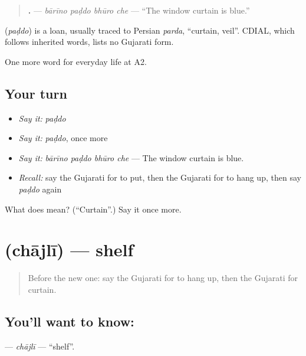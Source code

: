 \begin{quote}
\textbf{   .} — \emph{bārīno paḍdo bhūro che} — \textquotedblleft{}The window curtain is blue.\textquotedblright{}
\end{quote}

\begin{cousinweb}
\textbf{} (\emph{paḍdo}) is a loan, usually traced to Persian \emph{parda}, \textquotedblleft{}curtain, veil\textquotedblright{}. CDIAL, which follows inherited words, lists no Gujarati form.
\end{cousinweb}

\begin{grammarlens}[title={What you've built}]
One more word for everyday life at A2.
\end{grammarlens}

\subsection*{Your turn}
\begin{itemize}
\raggedright
  \item \emph{Say it:} \emph{paḍdo}
  \item \emph{Say it:} \emph{paḍdo}, once more
  \item \emph{Say it:} \emph{bārīno paḍdo bhūro che} — The window curtain is blue.
  \item \emph{Recall:} say the Gujarati for to put, then the Gujarati for to hang up, then say \emph{paḍdo} again
\end{itemize}

\begin{tcolorbox}[breakable,colback=teal!4,colframe=teal!35!black,title={Before you move on}]
What does  mean? (\textquotedblleft{}Curtain\textquotedblright{}.) Say it once more.
\end{tcolorbox}
\section[\texorpdfstring{\gu{છાજલી} (chājlī)}{છાજલી (chājlī)}]{ (chājlī) — shelf}

\label{lesson:GU-C157-chajli}



\begin{quote}
Before the new one: say the Gujarati for to hang up, then the Gujarati for curtain.
\end{quote}

\subsection*{You'll want to know: }
\textbf{} — \emph{chājlī} — \textquotedblleft{}shelf\textquotedblright{}.

